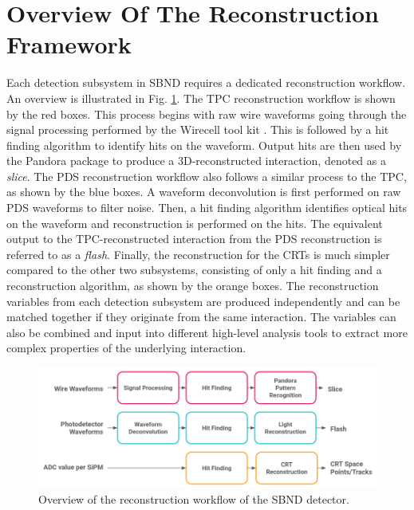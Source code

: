 \newpage


\section{Overview Of The Reconstruction Framework}
\label{sec:reco_overview}

Each detection subsystem in SBND requires a dedicated reconstruction workflow.
An overview is illustrated in Fig. \ref{fig:Reco_Workflow}.
The TPC reconstruction workflow is shown by the red boxes.
This process begins with raw wire waveforms going through the signal processing performed by the Wirecell tool kit \cite{wirecell}.
This is followed by a hit finding algorithm to identify hits on the waveform.
Output hits are then used by the Pandora package \cite{pandora} to produce a 3D-reconstructed interaction, denoted as a \textit{slice}.
The PDS reconstruction workflow also follows a similar process to the TPC, as shown by the blue boxes.
A waveform deconvolution is first performed on raw PDS waveforms to filter noise.
Then, a hit finding algorithm identifies optical hits on the waveform and reconstruction is performed on the hits.
The equivalent output to the TPC-reconstructed interaction from the PDS reconstruction is referred to as a \textit{flash}.
Finally, the reconstruction for the CRTs is much simpler compared to the other two subsystems, consisting of only a hit finding and a reconstruction algorithm, as shown by the orange boxes.
The reconstruction variables from each detection subsystem are produced independently and can be matched together if they originate from the same interaction. 
The variables can also be combined and input into different high-level analysis tools to extract more complex properties of the underlying interaction. 

\begin{figure}[htbp!] 
\centering    
\includegraphics[width=1.0\textwidth]{Reco_Workflow}
\caption[Reconstruction Framework of SBND]{
Overview of the reconstruction workflow of the SBND detector.
}
\label{fig:Reco_Workflow}
\end{figure}

